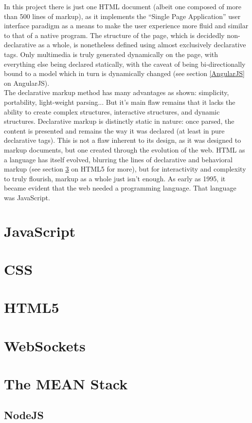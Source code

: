 In this project there is just one HTML document (albeit one composed of more than 500 lines of markup), as it
implements the ``Single Page Application'' user interface paradigm as a means to make the user experience more fluid
and similar to that of a native program. The structure of the page, which is decidedly non-declarative as a whole, is
nonetheless defined using almost exclusively declarative tags. Only multimedia is truly generated dynamically on the
page, with everything else being declared statically, with the caveat of being bi-directionally bound to a model which
in turn is dynamically changed (see section \ref{AngularJS} on AngularJS).\\

The declarative markup method has many advantages as shown: simplicity, portability, light-weight parsing... But it's
main flaw remains that it lacks the ability to create complex structures, interactive structures, and dynamic
structures. Declarative markup is distinctly static in nature: once parsed, the content is presented and remains the
way it was declared (at least in pure declarative tags). This is not a flaw inherent to its design, as it was designed
to markup documents, but one created through the evolution of the web. HTML as a language has itself evolved, blurring
the lines of declarative and behavioral markup (see section \ref{HTML5} on HTML5 for more), but for interactivity and
complexity to truly flourish, markup as a whole just isn't enough. As early as 1995, it became evident that the web
needed a programming language. That language was JavaScript.
\section{JavaScript}
\section{CSS}
\section{HTML5} \label{HTML5}
\section{WebSockets}
\section{The MEAN Stack}
\subsection{NodeJS}

